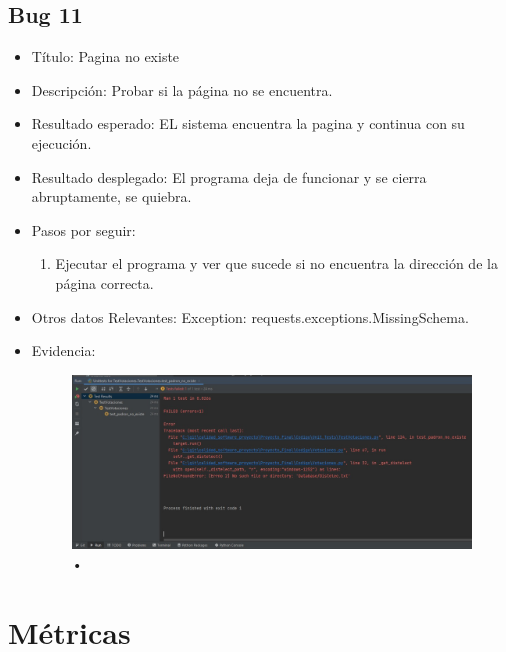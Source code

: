 \documentclass[conference]{IEEEtran}
\begin{document}
\subsection*{Bug 11}
\begin{itemize}
\item Título: Pagina no existe

\item Descripción: Probar si la página no se encuentra.

\item Resultado esperado: EL sistema encuentra la pagina y continua con su ejecución.

\item Resultado desplegado: El programa deja de funcionar y se cierra abruptamente, se quiebra. 

\item Pasos por seguir: 
\begin{enumerate}
\item Ejecutar el programa y ver que sucede si no encuentra la dirección de la página correcta.
\end{enumerate}
\item Otros datos Relevantes: Exception: requests.exceptions.MissingSchema.
\item Evidencia:
\begin{figure}[H]
\centering
\includegraphics[scale=0.2]{imagenes/padron_no_existe.jpeg}
\caption{•}
\end{figure}

\end{itemize}

\section{Métricas}
\end{document}
